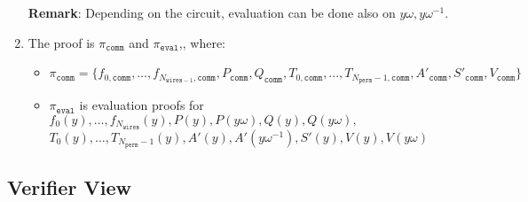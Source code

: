 \begin{enumerate}
        \textbf{Remark}: Depending on the circuit, evaluation can be done also on $y\omega, y\omega^{-1}$.
    \item The proof is $\pi_{\texttt{comm}}$ and $\pi_{\texttt{eval}}$,, where:
        \begin{itemize}
            \item $\pi_{\texttt{comm}} = \{f_{0, \texttt{comm}}, \dots, f_{N_{\texttt{wires} - 1}, \texttt{comm}},
                    P_{\texttt{comm}}, Q_{\texttt{comm}}, T_{0, \texttt{comm}}, ..., T_{N_{\texttt{perm}} - 1, \texttt{comm}},
                A'_{\texttt{comm}}, S'_{\texttt{comm}}, V_{\texttt{comm}} \}$
            \item  $\pi_{\texttt{eval}}$ is evaluation proofs for $f_0(y), \dots, f_{N_{\texttt{wires}}}(y),
                P(y), P(y\omega), Q(y), Q(y\omega),$ \\
                $T_0(y), \dots, T_{N_{\texttt{perm}} - 1}(y), A'(y), A'(y\omega^{-1}), S'(y), V(y), V(y\omega)$
        \end{itemize}
\end{enumerate}

\subsection{Verifier View}

